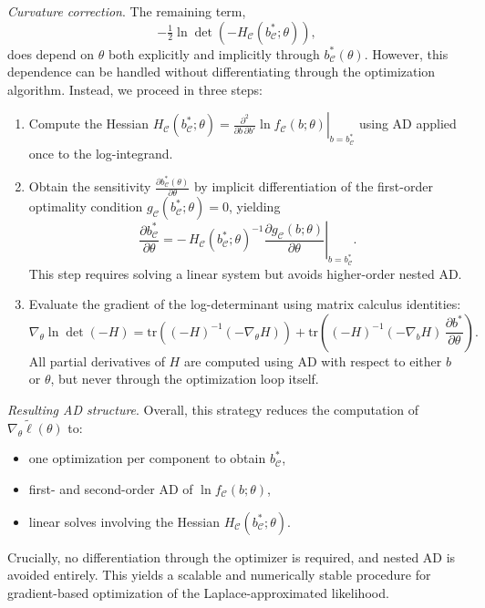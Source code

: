 \documentclass[12pt]{article}
\begin{document}
\medskip
\noindent
\emph{Curvature correction}.  
The remaining term,
\[
-\tfrac{1}{2}\ln\det\!\left(-H_{\mathcal{C}}(b_{\mathcal{C}}^*;\theta)\right),
\]
does depend on \(\theta\) both explicitly and implicitly through \(b_{\mathcal{C}}^*(\theta)\).
However, this dependence can be handled without differentiating through the optimization algorithm.
Instead, we proceed in three steps:
\begin{enumerate}
\item Compute the Hessian
\(
H_{\mathcal{C}}(b_{\mathcal{C}}^*;\theta)
=
\left.\frac{\partial^2}{\partial b\,\partial b'}\ln f_{\mathcal{C}}(b;\theta)\right\rvert_{b=b_{\mathcal{C}}^*}
\)
using AD applied once to the log-integrand.

\item Obtain the sensitivity
\(
\frac{\partial b_{\mathcal{C}}^*(\theta)}{\partial\theta}
\)
by implicit differentiation of the first-order optimality condition
\(g_{\mathcal{C}}(b_{\mathcal{C}}^*;\theta)=0\), yielding
\[
\frac{\partial b_{\mathcal{C}}^*}{\partial\theta}
=
-\,H_{\mathcal{C}}(b_{\mathcal{C}}^*;\theta)^{-1}
\left.\frac{\partial g_{\mathcal{C}}(b;\theta)}{\partial\theta}\right\rvert_{b=b_{\mathcal{C}}^*}.
\]
This step requires solving a linear system but avoids higher-order nested AD.

\item Evaluate the gradient of the log-determinant using matrix calculus identities:
\[
\nabla_\theta \ln\det(-H)
=
\mathrm{tr}\!\left((-H)^{-1}(-\nabla_\theta H)\right)
+
\mathrm{tr}\!\left((-H)^{-1}(-\nabla_b H)\,\frac{\partial b^*}{\partial\theta}\right).
\]
All partial derivatives of \(H\) are computed using AD with respect to either \(b\) or \(\theta\),
but never through the optimization loop itself.
\end{enumerate}

\medskip
\noindent
\emph{Resulting AD structure}.  
Overall, this strategy reduces the computation of \(\nabla_\theta \tilde\ell(\theta)\) to:
\begin{itemize}
\item one optimization per component to obtain \(b_{\mathcal{C}}^*\),
\item first- and second-order AD of \(\ln f_{\mathcal{C}}(b;\theta)\),
\item linear solves involving the Hessian \(H_{\mathcal{C}}(b_{\mathcal{C}}^*;\theta)\).
\end{itemize}
Crucially, no differentiation through the optimizer is required, and nested AD is avoided entirely.
This yields a scalable and numerically stable procedure for gradient-based optimization of the
Laplace-approximated likelihood.
\end{document}
